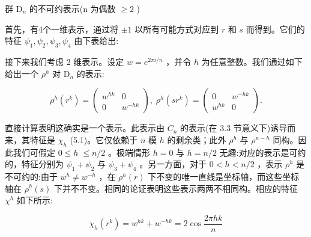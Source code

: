 \documentclass[10pt]{article}
\begin{document}
群 \({\mathrm{D}}_{n}\) 的不可约表示(n 为偶数 \(\geq  2\) )

首先，有4个一维表示，通过将 \(\pm  1\) 以所有可能方式对应到 \(r\) 和 \(s\) 而得到。它们的特征 \({\psi }_{1},{\psi }_{2},{\psi }_{3},{\psi }_{4}\) 由下表给出:

\begin{center}
\end{center}

接下来我们考虑 2 维表示。设定 \(w = {e}^{{2\pi i}/n}\) ，并令 \(h\) 为任意整数。我们通过如下给出一个 \({\rho }^{h}\) 对 \({\mathrm{D}}_{n}\) 的表示:

\[
{\rho }^{h}\left( {r}^{k}\right)  = \left( \begin{matrix} {w}^{hk} & 0 \\  0 & {w}^{-{hk}} \end{matrix}\right) ,\;{\rho }^{h}\left( {s{r}^{k}}\right)  = \left( \begin{matrix} 0 & {w}^{-{hk}} \\  {w}^{hk} & 0 \end{matrix}\right) .
\]

直接计算表明这确实是一个表示。此表示由 \({C}_{n}\) 的表示(在 3.3 节意义下)诱导而来，其特征是 \({\chi }_{h}\) (5.1)。它仅依赖于 \(n\) 模 \(h\) 的剩余类；此外 \({\rho }^{h}\) 与 \({\rho }^{n - h}\) 同构。因此我们可假定 \(0 \leq  h \; \leq  n/2\) 。极端情形 \(h = 0\) 与 \(h = n/2\) 无趣:对应的表示是可约的，特征分别为 \({\psi }_{1} + {\psi }_{2}\) 与 \({\psi }_{3} + {\psi }_{4}\) 。另一方面，对于 \(0 < h < n/2\) ，表示 \({\rho }^{h}\) 是不可约的:由于 \({w}^{h} \neq  {w}^{-h}\) ，在 \({\rho }^{h}\left( r\right)\) 下不变的唯一直线是坐标轴，而这些坐标轴在 \({\rho }^{h}\left( s\right)\) 下并不不变。相同的论证表明这些表示两两不相同构。相应的特征 \({\chi }^{h}\) 如下所示:

\[
{\chi }_{h}\left( {r}^{k}\right)  = {w}^{hk} + {w}^{-{hk}} = 2\cos \frac{2\pi hk}{n}
\]
\end{document}

